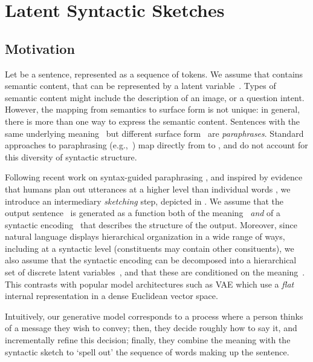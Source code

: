 \documentclass[11pt]{article}
\begin{document}
\section{Latent Syntactic Sketches}

\subsection{Motivation}

Let  be a sentence, represented as a sequence of
tokens. We assume that  contains semantic content, that
can be represented by a latent variable~. Types of
semantic content might include the description of an image, or a
question intent. However, the mapping from semantics to surface form
is not unique: in general, there is more than one way to express the
semantic content. Sentences with the same underlying
meaning~ but different surface form~ are
\textit{paraphrases}. Standard approaches to paraphrasing
(e.g.,~\citealt{bowman-etal-2016-generating}) map directly from
 to , and do not account for this
diversity of syntactic structure.



Following recent work on syntax-guided paraphrasing
\cite{chen-etal-2019-controllable,hosking-lapata-2021-factorising},
and inspired by evidence that humans plan out utterances at a higher
level than individual words \cite{martin2010planning}, we introduce an
intermediary \textit{sketching} step, depicted in
. We assume that the output sentence~
is generated as a function both of the meaning~
\textit{and} of a syntactic encoding~ that describes
the structure of the output. Moreover, since natural language displays
hierarchical organization in a wide range of ways, including at a
syntactic level (constituents may contain other consituents), we also
assume that the syntactic encoding  can be
decomposed into a hierarchical set of discrete latent
variables~, and that these  are conditioned on the
meaning~. This contrasts with
popular model architectures such as VAE \cite{bowman-ppvae} which use a
\emph{flat} internal representation in a dense Euclidean vector space.


Intuitively, our generative model corresponds to a process where a person thinks of a message they wish to convey; then, they decide roughly how to say it, and incrementally refine this decision; finally, they combine the meaning with the syntactic sketch to `spell out' the sequence of words making up the sentence. 
\end{document}
